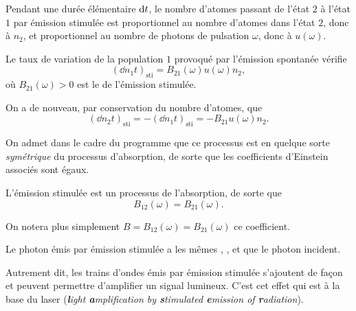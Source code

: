 \documentclass[12pt,fancy]{cours}
\begin{document}
Pendant une durée élémentaire $\mathrm{d} t$, le nombre d'atomes passant de l'état $2$ à l'état $1$ par émission stimulée est proportionnel au nombre d'atomes dans l'état $2$, donc à $n_2$, et proportionnel au nombre de photons de pulsation $\omega$, donc à $u(\omega)$.
\begin{theorem}\label{form:}
  Le taux de variation de la population $1$ provoqué par l'émission spontanée vérifie
  \begin{equation}
  \left(\dd{n_1}{t}\right)_\mathrm{sti}=B_{21}(\omega)u(\omega)n_2,
  \label{eqn:sti}
\end{equation}
  où $B_{21}(\omega)>0$ est le  de l'émission stimulée.
\end{theorem}
\begin{remarque}
  
  On a de nouveau, par conservation du nombre d'atomes, que
  \begin{equation}
    \left(\dd{n_2}{t}\right)_\mathrm{sti} = -\left(\dd{n_1}{t}\right)_\mathrm{sti}=-B_{21}u(\omega)n_2.
    \label{eqn:em_stim}
  \end{equation}
\end{remarque}

On admet dans le cadre du programme que ce processus est en quelque sorte \emph{symétrique} du processus d'absorption, de sorte que les coefficients d'Einstein associés sont égaux.
\begin{prop}\label{form:}
  L’émission stimulée est un processus  de l'absorption, de sorte que
  \begin{equation*}
  B_{12}(\omega)=B_{21}(\omega).
\end{equation*}
\end{prop}
On notera plus simplement $B=B_{12}(\omega)=B_{21}(\omega)$ ce coefficient.


\begin{prop}\label{prop:}
  Le photon émis par émission stimulée a les mêmes ,  , et  que le photon incident.
\end{prop}

Autrement dit, les trains d'ondes émis par émission stimulée s'ajoutent de façon  et peuvent permettre d'amplifier un signal lumineux. C'est cet effet qui est à la base du laser (\textit{\textbf{l}ight \textbf{a}mplification by \textbf{s}timulated \textbf{e}mission of \textbf{r}adiation}).
\end{document}
